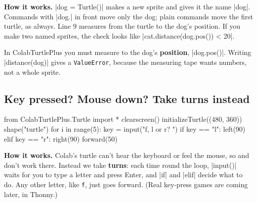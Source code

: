 \textbf{How it works.} \py|dog = Turtle()| makes a new sprite and gives it the name \py|dog|. Commands with \py|dog.| in front move only the dog; plain commands move the first turtle, as always. Line 9 measures from the turtle to the dog's position. If you make two named sprites, the check looks like \py|cat.distance(dog.pos()) < 20|.

\begin{watchout}
In ColabTurtlePlus you must measure to the dog's \textbf{position}, \py|dog.pos()|. Writing \py|distance(dog)| gives a \texttt{ValueError}, because the measuring tape wants numbers, not a whole sprite.
\end{watchout}

\subsection*{Key pressed? Mouse down? Take turns instead}

\begin{tcbraster}[raster columns=2, raster equal height=rows, raster column skip=12pt, raster valign=center, raster force size=false, raster column 1/.style={width=0.36\linewidth}, raster column 2/.style={width=0.64\linewidth-12pt}]
\begin{tcolorbox}[colback=white, colframe=white, boxrule=0pt, valign=center, left=0pt, right=0pt]
\begin{scratch}
\end{scratch}
\end{tcolorbox}
\begin{code}
from ColabTurtlePlus.Turtle import *
clearscreen()
initializeTurtle((480, 360))
shape("turtle")
for i in range(5):
    key = input("f, l or r? ")
    if key == "l":
        left(90)
    elif key == "r":
        right(90)
    forward(50)
\end{code}
\end{tcbraster}

\textbf{How it works.} Colab's turtle can't hear the keyboard or feel the mouse, so  and  don't work there. Instead we take \textbf{turns}: each time round the loop, \py|input()| waits for you to type a letter and press Enter, and \py|if| and \py|elif| decide what to do. Any other letter, like \texttt{f}, just goes forward. (Real key-press games are coming later, in Thonny.)

